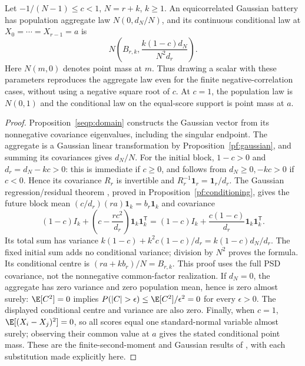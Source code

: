 \begin{proposition}
\label{seq-sim:scalar-law}
Let \(-1/(N-1)\leq c<1\), \(N=r+k\), \(k\geq1\).
An equicorrelated Gaussian battery has population aggregate law
\(N(0,d_N/N)\), and its continuous conditional law at
\(X_0=\cdots=X_{r-1}=a\) is
\[
 N\left(B_{r,k},\frac{k(1-c)d_N}{N^2d_r}\right).
\]
Here \(N(m,0)\) denotes point mass at \(m\). Thus drawing a scalar
with these parameters reproduces the aggregate law even for the finite
negative-correlation cases, without using a negative square root of
\(c\). At \(c=1\), the population law is \(N(0,1)\) and the
conditional law on the equal-score support is point mass at \(a\).
\end{proposition}
\begin{proof}
Proposition~\ref{seqp:domain} constructs the Gaussian vector from its
nonnegative covariance eigenvalues, including the singular endpoint.
The aggregate is a Gaussian linear transformation by
Proposition~\ref{pf:gaussian}, and summing its covariances gives
\(d_N/N\). For the initial block, \(1-c>0\) and
\(d_r=d_N-kc>0\): this is immediate if \(c\geq0\), and follows
from \(d_N\geq0,-kc>0\) if \(c<0\). Hence its covariance
\(R_r\) is invertible and
\(R_r^{-1}\mathbf1_r=\mathbf1_r/d_r\).
The Gaussian regression/residual theorem
\citep[Theorems 3.5.1--3.5.2]{gallager2013}, proved in
Proposition~\ref{pf:conditioning}, gives the future block mean
\((c/d_r)(ra)\mathbf1_k=b_r\mathbf1_k\) and covariance
\[
 (1-c)I_k+\left(c-\frac{rc^2}{d_r}\right)
        \mathbf1_k\mathbf1_k^{\mathsf T}
 =(1-c)I_k+\frac{c(1-c)}{d_r}\mathbf1_k\mathbf1_k^{\mathsf T}.
\]
Its total sum has variance
\(k(1-c)+k^2c(1-c)/d_r=k(1-c)d_N/d_r\).
The fixed initial sum adds no conditional variance; division by \(N^2\)
proves the formula. Its conditional centre is
\((ra+kb_r)/N=B_{r,k}\). This proof uses the full PSD covariance,
not the nonnegative common-factor realization. If \(d_N=0\), the
aggregate has zero variance and zero population mean, hence is zero
almost surely: \(\E[C^2]=0\) implies
\(P(|C|>\epsilon)\leq\E[C^2]/\epsilon^2=0\) for every
\(\epsilon>0\). The displayed conditional centre and variance are
also zero. Finally, when \(c=1\),
\(\E[(X_i-X_j)^2]=0\), so all scores equal one standard-normal
variable almost surely; observing their common value at \(a\) gives
the stated conditional point mass. These are the finite-second-moment
and Gaussian results of \citet{durrett2019,gallager2013}, with each
substitution made explicitly here.
\end{proof}

